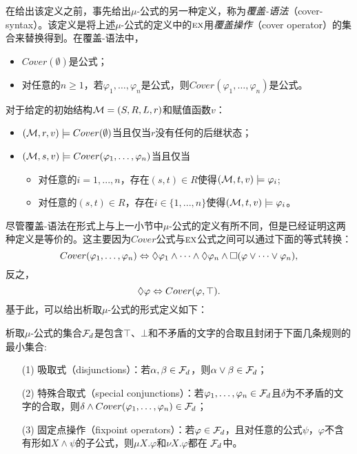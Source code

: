 在给出该定义之前，事先给出$\mu$-公式的另一种定义，称为\emph{覆盖-语法}（cover-syntax）。该定义是将上述$\mu$-公式的定义中的$\textsc{e}\textsc{x}$用\emph{覆盖操作}（cover operator）的集合来替换得到。在覆盖-语法中，
\begin{itemize}
	\item $Cover(\emptyset)$是公式；
	\item 对任意的$n\geq 1$，若$\varphi_1,\dots, \varphi_n$是公式，则$Cover(\varphi_1, \dots, \varphi_n)$是公式。
\end{itemize}
对于给定的初始结构${\cal M}=(S,R,L,r)$和赋值函数$v$：
\begin{itemize}
	\item $({\cal M},r,v) \models Cover(\emptyset)$当且仅当$r$没有任何的后继状态；
	\item $({\cal M}, s,v ) \models Cover(\varphi_1, \dots, \varphi_n)$当且仅当
	\begin{itemize}
		\item 对任意的$i = 1, . . . , n$，存在$(s, t) \in R$使得$({\cal M}, t,v) \models \varphi_i$;
		\item 对任意的$(s, t) \in R$，存在$i\in \{1, . . . , n\}$使得$({\cal M}, t,v) \models \varphi_i$。
	\end{itemize}
\end{itemize}

尽管覆盖-语法在形式上与上一小节中$\mu$-公式的定义有所不同，但是已经证明这两种定义是等价的\cite{d2006modal}。这主要因为$Cover$公式与$\textsc{e}\textsc{x}$公式之间可以通过下面的等式转换：
\[
Cover(\varphi_1, \dots, \varphi_n) \Leftrightarrow \lozenge \varphi_1 \wedge \dots \wedge \lozenge \varphi_n \wedge \square(\varphi \vee \dots \vee \varphi_n),
\]
反之，
\[
\lozenge \varphi \Leftrightarrow Cover(\varphi, \top).
\]
基于此，可以给出析取$\mu$-公式的形式定义如下：
\begin{definition}
	析取$\mu$-公式的集合${\cal F}_d$是包含$\top$、$\bot$和不矛盾的文字的合取且封闭于下面几条规则的最小集合:
	\begin{itemize}
		\item[(1)] 吸取式（disjunctions）：若$\alpha, \beta \in {\cal F}_d$，则$\alpha \vee \beta \in {\cal F}_d$；
		\item[(2)] 特殊合取式（special conjunctions）：若$\varphi_1, \dots, \varphi_n\in {\cal F}_d$且$\delta$为不矛盾的文字的合取，则$\delta \wedge Cover(\varphi_1, \dots, \varphi_n) \in {\cal F}_d$；
		\item[(3)] 固定点操作（fixpoint operators）：若$\varphi\in  {\cal F}_d$，且对任意的公式$\psi$，$\varphi$不含有形如$X \wedge \psi$的子公式，则$\mu X. \varphi$和$\nu X. \varphi$都在 ${\cal F}_d$中。
	\end{itemize}	
\end{definition}


